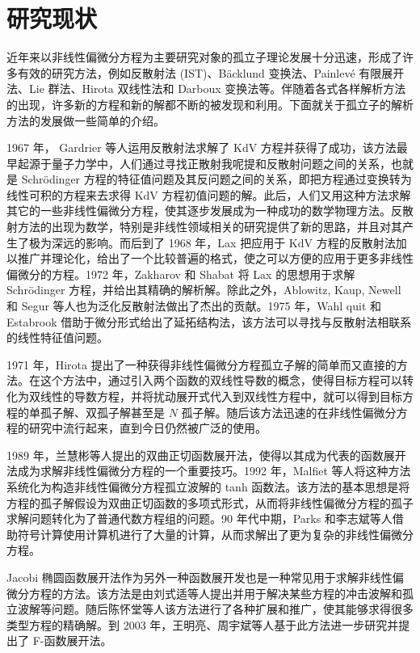 \section{研究现状}
近年来以非线性偏微分方程为主要研究对象的孤立子理论发展十分迅速，形成了许多有效的研究方法，例如反散射法 (IST)、B\"{a}cklund 变换法、Painlev\'{e} 有限展开法、Lie 群法、Hirota 双线性法和 Darboux 变换法等。伴随着各式各样解析方法的出现，许多新的方程和新的解都不断的被发现和利用。下面就关于孤立子的解析方法的发展做一些简单的介绍。

1967 年， Gardrier 等人运用反散射法求解了 KdV 方程并获得了成功，该方法最早起源于量子力学中，人们通过寻找正散射我呢提和反散射问题之间的关系，也就是 Schr\"{o}dinger 方程的特征值问题及其反问题之间的关系，即把方程通过变换转为线性可积的方程来去求得 KdV 方程初值问题的解。此后，人们又用这种方法求解其它的一些非线性偏微分方程，使其逐步发展成为一种成功的数学物理方法。反散射方法的出现为数学，特别是非线性领域相关的研究提供了新的思路，并且对其产生了极为深远的影响。而后到了 1968 年，Lax 把应用于 KdV 方程的反散射法加以推广并理论化，给出了一个比较普遍的格式，使之可以方便的应用于更多非线性偏微分的方程。1972 年，Zakharov 和 Shabat 将 Lax 的思想用于求解 Schr\"{o}dinger 方程，并给出其精确的解析解。除此之外，Ablowitz, Kaup, Newell 和 Segur 等人也为泛化反散射法做出了杰出的贡献。1975 年，Wahl quit 和 Estabrook 借助于微分形式给出了延拓结构法，该方法可以寻找与反散射法相联系的线性特征值问题。

1971 年，Hirota 提出了一种获得非线性偏微分方程孤立子解的简单而又直接的方法。在这个方法中，通过引入两个函数的双线性导数的概念，使得目标方程可以转化为双线性的导数方程，并将扰动展开式代入到双线性方程中，就可以得到目标方程的单孤子解、双孤子解甚至是 $N$ 孤子解。随后该方法迅速的在非线性偏微分方程的研究中流行起来，直到今日仍然被广泛的使用。

1989 年，兰慧彬等人提出的双曲正切函数展开法，使得以其成为代表的函数展开法成为求解非线性偏微分方程的一个重要技巧。1992 年，Malfiet 等人将这种方法系统化为构造非线性偏微分方程孤立波解的 tanh 函数法。该方法的基本思想是将方程的孤子解假设为双曲正切函数的多项式形式，从而将非线性偏微分方程的孤子求解问题转化为了普通代数方程组的问题。90 年代中期，Parks 和李志斌等人借助符号计算使用计算机进行了大量的计算，从而求解出了更为复杂的非线性偏微分方程。

Jacobi 椭圆函数展开法作为另外一种函数展开发也是一种常见用于求解非线性偏微分方程的方法。该方法是由刘式适等人提出并用于解决某些方程的冲击波解和孤立波解等问题。随后陈怀堂等人该方法进行了各种扩展和推广，使其能够求得很多类型方程的精确解。到 2003 年，王明亮、周宇斌等人基于此方法进一步研究并提出了 F-函数展开法。

